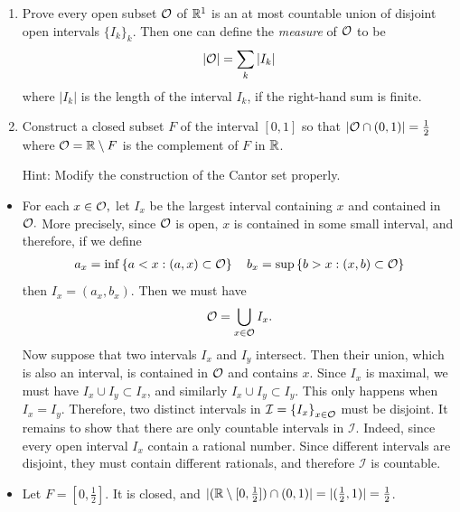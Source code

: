 \begin{problem}
\begin{enumerate}
    \item[(a)] Prove every open subset $\mathcal{O}$ of $\mathbb{R}^1$ is an at most countable union of disjoint open intervals $\{I_k\}_k$. Then one can define the \emph{measure} of $\mathcal{O}$ to be
    $$ |\mathcal{O}| = \sum_k |I_k| $$
    where $|I_k|$ is the length of the interval $I_k$, if the right-hand sum is finite.
    \item[(b)] Construct a closed subset $F$ of the interval $[0,1]$ so that $|\mathcal{O} \cap (0,1)| = \frac{1}{2}$ where $\mathcal{O} = \mathbb{R} \setminus F$ is the complement of $F$ in $\mathbb{R}$.
    
    Hint: Modify the construction of the Cantor set properly.
\end{enumerate}
\begin{solution}
\begin{itemize}
    \item[(a)]For each $x\in \mathcal{O},$ let $I_x$ be the largest interval containing $x$ and contained in $\mathcal{O}.$ More precisely, since $\mathcal{O}$ is open, $x$ is contained in some small interval, and therefore, if we define 
    \begin{align*}
        a_x=\inf \left\{ a<x:(a,x)\subset \mathcal{O}\right\}\quad b_x=\sup\left\{ b>x:(x,b)\subset \mathcal{O}\right\}
    \end{align*}
    then $I_x=(a_x,b_x).$ Then we must have 
    \begin{align*}
        \mathcal{O}=\bigcup_{x\in \mathcal{O}}I_x.
    \end{align*}
    Now suppose that two intervals $I_x$ and $I_y$ intersect. Then their union, which is also an interval, is contained in $\mathcal{O}$ and contains $x.$ Since $I_x$ is maximal, we must have $I_x\cup I_y\subset I_x$, and similarly $I_x\cup I_y\subset I_y.$ This only happens when $I_x=I_y.$ Therefore, two distinct intervals in $\mathcal{I}=\left\{ I_x\right\}_{x\in \mathcal{O}}$ must be disjoint. It remains to show that there are only countable intervals in $\mathcal{I}.$ Indeed, since every open interval $I_x$ contain a rational number. Since different intervals are disjoint, they must contain different rationals, and therefore $\mathcal{I}$ is countable.
    \item[(b)] Let $F = [0,\frac{1}{2}]$. It is closed, and $|(\mathbb{R} \setminus [0,\frac{1}{2}]) \cap (0,1)| = |(\frac{1}{2},1)| = \frac{1}{2}$.
\end{itemize}
\end{solution}
\end{problem}
